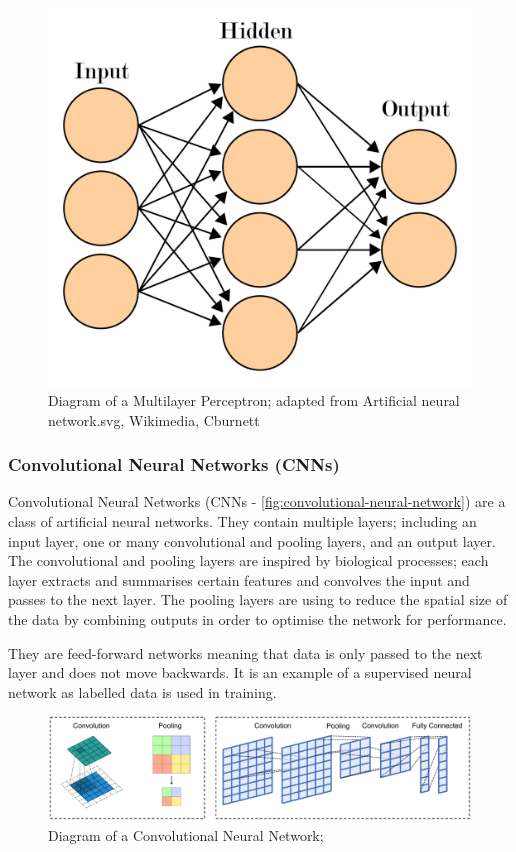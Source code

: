 \begin{figure}[hbt!]
    \centering
    \includegraphics[width=0.4\columnwidth]{figures/multilayer-perceptron.pdf}
    \caption[Diagram of a Multilayer Perceptron]{Diagram of a Multilayer Perceptron; adapted from Artificial neural network.svg, Wikimedia, Cburnett}
    \label{fig:multilayer-perceptron}
\end{figure}
\FloatBarrier

\subsubsection{Convolutional Neural Networks (CNNs)}
Convolutional Neural Networks (CNNs - \autoref{fig:convolutional-neural-network}) are a class of artificial neural networks. They contain
multiple layers; including an input layer, one or many convolutional and pooling layers, and an
output layer. The convolutional and pooling layers are inspired by biological processes; each
layer extracts and summarises certain features and convolves the input and passes to the next
layer. The pooling layers are using to reduce the spatial size of the data by combining outputs
in order to optimise the network for performance.

They are feed-forward networks meaning that data is only passed to the next layer and does
not move backwards. It is an example of a supervised neural network as labelled data is used
in training.

\begin{figure}[hbt!]
    \centering
    \includegraphics[width=0.75\columnwidth]{figures/convolutional-neural-networks.pdf}
    \caption[Diagram of a Convolutional Neural Network]{Diagram of a Convolutional Neural Network; \parencite{Maier2019}}
    \label{fig:convolutional-neural-network}
\end{figure}
\FloatBarrier

